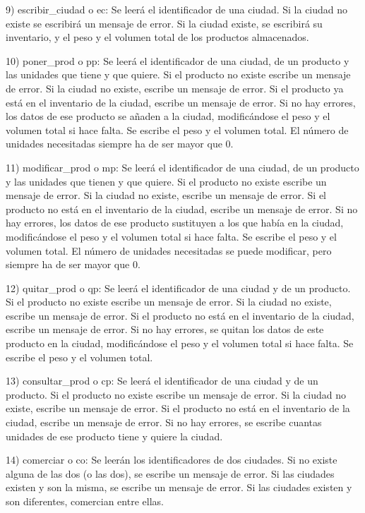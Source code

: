 9) escribir\+\_\+ciudad o ec\+: Se leerá el identificador de una ciudad. Si la ciudad no existe se escribirá un mensaje de error. Si la ciudad existe, se escribirá su inventario, y el peso y el volumen total de los productos almacenados.

10) poner\+\_\+prod o pp\+: Se leerá el identificador de una ciudad, de un producto y las unidades que tiene y que quiere. Si el producto no existe escribe un mensaje de error. Si la ciudad no existe, escribe un mensaje de error. Si el producto ya está en el inventario de la ciudad, escribe un mensaje de error. Si no hay errores, los datos de ese producto se añaden a la ciudad, modificándose el peso y el volumen total si hace falta. Se escribe el peso y el volumen total. El número de unidades necesitadas siempre ha de ser mayor que 0.

11) modificar\+\_\+prod o mp\+: Se leerá el identificador de una ciudad, de un producto y las unidades que tienen y que quiere. Si el producto no existe escribe un mensaje de error. Si la ciudad no existe, escribe un mensaje de error. Si el producto no está en el inventario de la ciudad, escribe un mensaje de error. Si no hay errores, los datos de ese producto sustituyen a los que había en la ciudad, modificándose el peso y el volumen total si hace falta. Se escribe el peso y el volumen total. El número de unidades necesitadas se puede modificar, pero siempre ha de ser mayor que 0.

12) quitar\+\_\+prod o qp\+: Se leerá el identificador de una ciudad y de un producto. Si el producto no existe escribe un mensaje de error. Si la ciudad no existe, escribe un mensaje de error. Si el producto no está en el inventario de la ciudad, escribe un mensaje de error. Si no hay errores, se quitan los datos de este producto en la ciudad, modificándose el peso y el volumen total si hace falta. Se escribe el peso y el volumen total.

13) consultar\+\_\+prod o cp\+: Se leerá el identificador de una ciudad y de un producto. Si el producto no existe escribe un mensaje de error. Si la ciudad no existe, escribe un mensaje de error. Si el producto no está en el inventario de la ciudad, escribe un mensaje de error. Si no hay errores, se escribe cuantas unidades de ese producto tiene y quiere la ciudad.

14) comerciar o co\+: Se leerán los identificadores de dos ciudades. Si no existe alguna de las dos (o las dos), se escribe un mensaje de error. Si las ciudades existen y son la misma, se escribe un mensaje de error. Si las ciudades existen y son diferentes, comercian entre ellas.

